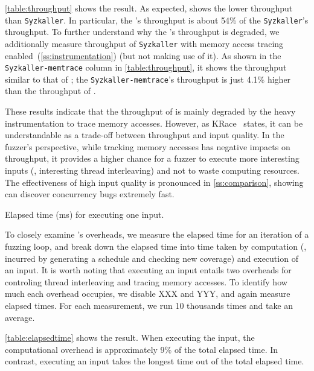\autoref{table:throughput} shows the result. As expected, \sys shows
the lower throughput than \texttt{Syzkaller}. In particular, the
\sys's throughput is about 54\% of the \texttt{Syzkaller}'s
throughput.
%
To further understand why the \sys's throughput is degraded, we
additionally measure throughput of \texttt{Syzkaller} with memory
access tracing enabled~(\autoref{ss:instrumentation}) (but not making
use of it).
%
As shown in the \texttt{Syzkaller-memtrace} column in
\autoref{table:throughput}, it shows the throughput similar to that of
\sys; the \texttt{Syzkaller-memtrace}'s throughput is just 4.1\%
higher than the throughput of \sys.


These results indicate that the throughput of \sys is mainly degraded
by the heavy instrumentation to trace memory accesses.
%
However, as KRace~\cite{krace} states, it can be understandable as a
trade-off between throughput and input quality.
%
In the fuzzer's perspective, while tracking memory accesses has
negative impacts on throughput, it provides a higher chance for a
fuzzer to execute more interesting inputs (\ie, interesting thread
interleaving) and not to waste computing resources.
%
The effectiveness of high input quality is pronounced in
\autoref{ss:comparison}, showing \sys can discover concurrency bugs
extremely fast.




%
\begin{table}[t]
  \centering
  
  \caption{ Elapsed time (ms) for executing one input.}
  \label{table:elapsedtime}
\end{table}
%
%
To closely examine \sys's overheads, we measure the elapsed time for
an iteration of a fuzzing loop, and break down the elapsed time into
time taken by computation (\ie, incurred by generating a schedule and
checking new coverage) and execution of an input.
%
It is worth noting that executing an input entails two overheads for
controling thread interleaving and tracing memory accesses. To
identify how much each overhead occupies, we disable XXX and YYY, and
again measure elapsed times.
%
For each measurement, we run 10 thousands times and take an average.

\autoref{table:elapsedtime} shows the result. When executing the
input, the computational overhead is approximately 9\% of the total
elapsed time. In contrast, executing an input takes the longest time
out of the total elapsed time.
\dr{}



